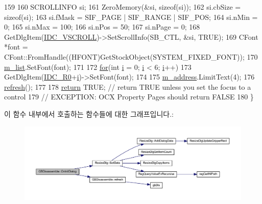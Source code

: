 \begin{DoxyCode}
159 
160   SCROLLINFO si;
161   ZeroMemory(&si, sizeof(si));
162   si.cbSize = sizeof(si);
163   si.fMask = SIF\_PAGE | SIF\_RANGE | SIF\_POS;
164   si.nMin = 0;
165   si.nMax = 100;
166   si.nPos = 50;
167   si.nPage = 0;
168   GetDlgItem(\mbox{\hyperlink{resource_8h_a420d68e24dfd23b92f4c35464790687e}{IDC\_VSCROLL}})->SetScrollInfo(SB\_CTL, &si, TRUE);
169   CFont *font = CFont::FromHandle((HFONT)GetStockObject(SYSTEM\_FIXED\_FONT));
170   \mbox{\hyperlink{class_g_b_disassemble_a9c85552a373d70a612231c68d2702658}{m\_list}}.SetFont(font);
171   
172   \mbox{\hyperlink{expr-lex_8cpp_aa656b692c972ef767f6fe691b696c978}{for}}(\textcolor{keywordtype}{int} \mbox{\hyperlink{expr-lex_8cpp_acb559820d9ca11295b4500f179ef6392}{i}} = 0; \mbox{\hyperlink{expr-lex_8cpp_acb559820d9ca11295b4500f179ef6392}{i}} < 6; \mbox{\hyperlink{expr-lex_8cpp_acb559820d9ca11295b4500f179ef6392}{i}}++)
173     GetDlgItem(\mbox{\hyperlink{resource_8h_ab22910476aba368f21be1572a58db5ca}{IDC\_R0}}+\mbox{\hyperlink{expr-lex_8cpp_acb559820d9ca11295b4500f179ef6392}{i}})->SetFont(font);
174 
175   \mbox{\hyperlink{class_g_b_disassemble_ae307e3f799572b623e21bb94c345c5ce}{m\_address}}.LimitText(4);
176   \mbox{\hyperlink{class_g_b_disassemble_a0ae217c08ead8a3cf62c59dadaa27fde}{refresh}}();
177   
178   \mbox{\hyperlink{gb_codes_8h_a9717e7bbecb906637e86cef6da3d83c2}{return}} TRUE;  \textcolor{comment}{// return TRUE unless you set the focus to a control}
179                 \textcolor{comment}{// EXCEPTION: OCX Property Pages should return FALSE}
180 \}
\end{DoxyCode}
이 함수 내부에서 호출하는 함수들에 대한 그래프입니다.\+:
\nopagebreak
\begin{figure}[H]
\begin{center}
\leavevmode
\includegraphics[width=350pt]{class_g_b_disassemble_a62b06166477944c21edeeda699fcdba5_cgraph}
\end{center}
\end{figure}
\mbox{\label{class_g_b_disassemble_ac818bf955fab0b2433d68ed992033169}} 
